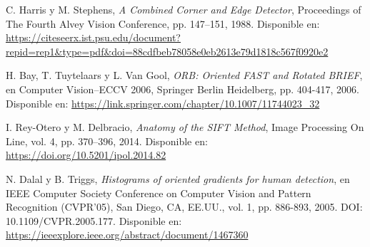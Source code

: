 \documentclass[a4paper]{article}
\begin{document}
\begin{thebibliography}{10}

  C. Harris y M. Stephens, \emph{A Combined Corner and Edge Detector}, Proceedings of The Fourth Alvey Vision Conference, pp. 147–151, 1988. Disponible en: \url{https://citeseerx.ist.psu.edu/document?repid=rep1&type=pdf&doi=88cdfbeb78058e0eb2613e79d1818c567f0920e2}
  
  H. Bay, T. Tuytelaars y L. Van Gool, \emph{ORB: Oriented FAST and Rotated BRIEF}, en Computer Vision–ECCV 2006, Springer Berlin Heidelberg, pp. 404-417, 2006. Disponible en: \url{https://link.springer.com/chapter/10.1007/11744023_32}
  
  I. Rey-Otero y M. Delbracio, \emph{Anatomy of the SIFT Method}, Image Processing On Line, vol. 4, pp. 370–396, 2014. Disponible en: \url{https://doi.org/10.5201/ipol.2014.82}
  
  N. Dalal y B. Triggs, \emph{Histograms of oriented gradients for human detection}, en IEEE Computer Society Conference on Computer Vision and Pattern Recognition (CVPR'05), San Diego, CA, EE.UU., vol. 1, pp. 886-893, 2005. DOI: 10.1109/CVPR.2005.177. Disponible en: \url{https://ieeexplore.ieee.org/abstract/document/1467360}
  
  \end{thebibliography}
\end{document}
